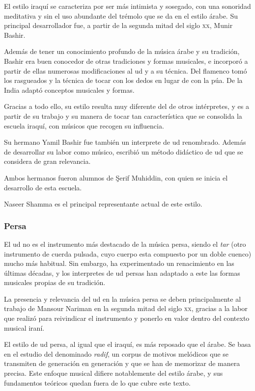 El estilo iraquí se caracteriza por ser más intimista y sosegado, con una sonoridad meditativa y sin el uso abundante del trémolo que se da en el estilo árabe. Su principal desarrollador fue, a partir de la segunda mitad del siglo \textsc{xx}, Munir Bashir.

Además de tener un conocimiento profundo de la música árabe y su tradición, Bashir era buen conocedor de otras tradiciones y formas musicales, e incorporó a partir de ellas numerosas modificaciones al ud y a su técnica. Del flamenco tomó los rasgueados y la técnica de tocar con los dedos en lugar de con la púa. De la India adaptó conceptos musicales y formas.

Gracias a todo ello, su estilo resulta muy diferente del de otros intérpretes, y es a partir de su trabajo y su manera de tocar tan característica que se consolida la escuela iraquí, con músicos que recogen su influencia.

Su hermano Yamil Bashir fue también un interprete de ud renombrado. Además de desarrollar su labor como músico, escribió un método didáctico de ud que se considera de gran relevancia.

Ambos hermanos fueron alumnos de Şerif Muhiddin, con quien se inicia el desarrollo de esta escuela.

Naseer Shamma es el principal representante actual de este estilo.


\subsubsection{Persa}

El ud no es el instrumento más destacado de la música persa, siendo el \emph{tar} (otro instrumento de cuerda pulsada, cuyo cuerpo esta compuesto por un doble cuenco) mucho más habitual. Sin embargo, ha experimentado un renacimiento en las últimas décadas, y los interpretes de ud persas han adaptado a este las formas musicales propias de su tradición.

La presencia y relevancia del ud en la música persa se deben principalmente al trabajo de Mansour Nariman en la segunda mitad del siglo \textsc{xx}, gracias a la labor que realizó para reivindicar el instrumento y ponerlo en valor dentro del contexto musical iraní.

El estilo de ud persa, al igual que el iraquí, es más reposado que el árabe. Se basa en el estudio del denominado \emph{radif}, un corpus de motivos melódicos que se transmiten de generación en generación y que se han de memorizar de manera precisa. Este enfoque musical difiere notablemente del estilo árabe, y sus fundamentos teóricos quedan fuera de lo que cubre este texto.

